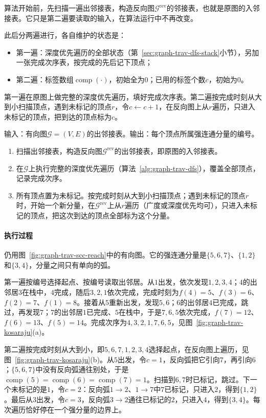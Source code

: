 算法开始前，先扫描一遍出邻接表，构造反向图$\mathcal G^{\mathrm{rev}}$的邻接表，也就是原图的入邻接表。它只是第二遍要读取的输入，在算法运行中不再改变。

此后分两遍进行，各自维护的状态是：
\begin{itemize}
  \item 第一遍：深度优先遍历的全部状态（第~\ref{sec:graph-trav-dfs-stack}小节），另加一张完成次序表，按完成的先后记下顶点；
  \item 第二遍：标签数组$\operatorname{comp}(\cdot)$，初始全为$0$；已用的标签个数$c$，初始为$0$。
\end{itemize}
第一遍在原图上做完整的深度优先遍历，填好完成次序表。第二遍按完成时刻从大到小扫描顶点，遇到未标记的顶点$r$，令$c\gets c+1$，在反向图上从$r$遍历，只进入未标记的顶点，把到达的顶点标为$c$。

\begin{algorithm}[Kosaraju强连通分量算法]
\label{alg:graph-trav-kosaraju}
输入：有向图$\mathcal G=(V,E)$的出邻接表。输出：每个顶点所属强连通分量的编号。
\begin{enumerate}
  \item 扫描出邻接表，构造反向图$\mathcal G^{\mathrm{rev}}$的出邻接表，即原图的入邻接表。
  \item 在$\mathcal G$上执行完整的深度优先遍历（算法~\ref{alg:graph-trav-dfs}），覆盖全部顶点，记录完成次序。
  \item 所有顶点置为未标记。按完成时刻从大到小扫描顶点；遇到未标记的顶点$r$时，开始一个新分量，在$\mathcal G^{\mathrm{rev}}$上从$r$遍历（广度或深度优先均可），只进入未标记的顶点，把这次到达的顶点全部标为这个分量。
\end{enumerate}
\end{algorithm}

\paragraph{执行过程}
仍用图~\ref{fig:graph-trav-scc-reach}中的有向图。它的强连通分量是$\{5,6,7\}$、$\{1,2\}$和$\{3,4\}$，分量之间只有单向的弧。

第一遍按编号选择起点、按编号读取出邻居。从$1$出发，依次发现$1,2,3,4$；$4$的出邻居$3$在栈中，$4$完成，随后$3,2,1$依次完成，完成时刻为$f(4)=5$、$f(3)=6$、$f(2)=7$、$f(1)=8$。接着从$5$重新出发，发现$5,6$；$6$的出邻居$4$已完成，跳过，再发现$7$；$7$的出邻居$1$已完成、$5$在栈中，于是$7,6,5$依次完成，$f(7)=12$、$f(6)=13$、$f(5)=14$。完成次序为$4,3,2,1,7,6,5$，见图~\ref{fig:graph-trav-kosaraju}(a)。

第二遍按完成时刻从大到小，即$5,6,7,1,2,3,4$选择起点，在反向图上遍历，见图~\ref{fig:graph-trav-kosaraju}(b)。从$5$出发，令$c=1$，反向弧把它引向$7$，再引向$6$；$\{5,6,7\}$中没有反向弧通往别处，于是$\operatorname{comp}(5)=\operatorname{comp}(6)=\operatorname{comp}(7)=1$。扫描到$6,7$时已标记，跳过。下一个未标记的是$1$，令$c=2$：反向弧$1\to2$、$1\to7$中$7$已标记，只进入$2$，得到$\{1,2\}$。最后从$3$出发，令$c=3$，反向弧$3\to2$通往已标记的$2$，只进入$4$，得到$\{3,4\}$。每次遍历恰好停在一个强分量的边界上。

